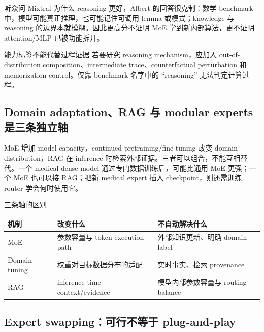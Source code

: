 听众问 Mixtral 为什么 reasoning 更好，Albert 的回答很克制：数学 benchmark 中，模型可能真正推理，也可能记住可调用 lemma 或模式；knowledge 与 reasoning 的边界本就模糊。因此更高分不证明 MoE 学到新内部算法，更不证明 attention/MLP 已被功能拆开。

\begin{warningbox}{能力标签不能代替过程证据}
若要研究 reasoning mechanism，应加入 out-of-distribution composition、intermediate trace、counterfactual perturbation 和 memorization control。仅靠 benchmark 名字中的 “reasoning” 无法判定计算过程。
\end{warningbox}


\subsection{Domain adaptation、RAG 与 modular experts 是三条独立轴}

MoE 增加 model capacity，continued pretraining/fine-tuning 改变 domain distribution，RAG 在 inference 时检索外部证据。三者可以组合，不能互相替代。一个 medical dense model 通过专门数据训练后，可能比通用 MoE 更强；一个 MoE 也可以接 RAG；把新 medical expert 插入 checkpoint，则还需训练 router 学会何时使用它。

\begin{knowledgebox}{三条轴的区别}
\begin{tabularx}{\textwidth}{L{0.18\textwidth} L{0.27\textwidth} X}
\toprule
机制 & 改变什么 & 不自动解决什么 \\
\midrule
MoE & 参数容量与 token execution path & 外部知识更新、明确 domain label \\
Domain tuning & 权重对目标数据分布的适配 & 实时事实、检索 provenance \\
RAG & inference-time context/evidence & 模型内部参数容量与 routing balance \\
\bottomrule
\end{tabularx}
\end{knowledgebox}


\subsection{Expert swapping：可行不等于 plug-and-play}

